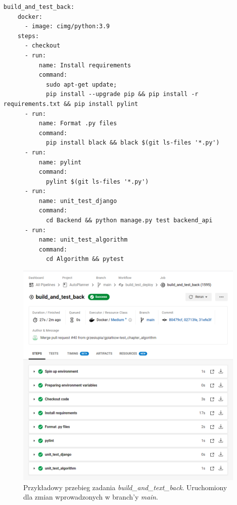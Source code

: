 \begin{itemize}
\begin{lstlisting}[caption=Część skryptu config.yml odpowiadająca za wykonanie zadania \textit{build\_and\_test\_back}.]
build_and_test_back:
    docker:
      - image: cimg/python:3.9
    steps:
      - checkout
      - run:
          name: Install requirements
          command:
            sudo apt-get update;
            pip install --upgrade pip && pip install -r requirements.txt && pip install pylint
      - run:
          name: Format .py files
          command:
            pip install black && black $(git ls-files '*.py')
      - run:
          name: pylint
          command:
            pylint $(git ls-files '*.py')
      - run:
          name: unit_test_django
          command:
            cd Backend && python manage.py test backend_api
      - run:
          name: unit_test_algorithm
          command:
            cd Algorithm && pytest
\end{lstlisting} 
\newpage
\begin{figure}[H]
\centering\includegraphics[width=\textwidth]{figures/circleci_test_back}
\caption{Przykładowy przebieg zadania \textit{build\_and\_text\_back}. Uruchomiony dla zmian wprowadzonych w branch'y \textit{main}.}
\end{figure} 


\end{itemize}
